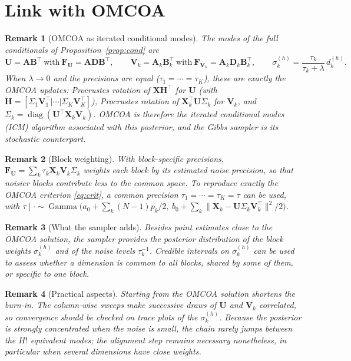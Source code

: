 \documentclass[11pt]{article}
\newtheorem{remark}{Remark}
\DeclareMathOperator{\diag}{diag}
\DeclareMathOperator{\Ga}{Gamma}
\newcommand{\X}{\mathbf{X}}
\newcommand{\U}{\mathbf{U}}
\newcommand{\V}{\mathbf{V}}
\newcommand{\F}{\mathbf{F}}
\begin{document}
\section{Link with OMCOA}

\begin{remark}[OMCOA as iterated conditional modes]
The modes of the full conditionals of Proposition~\ref{prop:cond} are
\[
  \U=\mathbf A\mathbf B^\intercal\ \text{with}\ \F_{\U}=\mathbf A\mathbf D\mathbf B^\intercal,\qquad
  \V_k=\mathbf A_k\mathbf B_k^\intercal\ \text{with}\ \F_{\V_k}=\mathbf A_k\mathbf D_k\mathbf B_k^\intercal,\qquad
  \sigma_k^{(h)}=\frac{\tau_k}{\tau_k+\lambda}\,d_k^{(h)} .
\]
When $\lambda\to0$ and the precisions are equal ($\tau_1=\cdots=\tau_K$), these are exactly the OMCOA updates:
Procrustes rotation of $\X\mathbf H^\intercal$ for $\U$ (with $\mathbf H=[\Sigma_1\V_1^\intercal|\cdots|\Sigma_K\V_K^\intercal]$),
Procrustes rotation of $\X_k^\intercal\U\Sigma_k$ for $\V_k$, and $\Sigma_k=\diag(\U^\intercal\X_k\V_k)$. OMCOA is therefore the
iterated conditional modes (ICM) algorithm \cite{besag1986} associated with this posterior, and the Gibbs sampler is its
stochastic counterpart.
\end{remark}

\begin{remark}[Block weighting]
With block-specific precisions, $\F_{\U}=\sum_k\tau_k\X_k\V_k\Sigma_k$ weights each block by its estimated noise
precision, so that noisier blocks contribute less to the common space. To reproduce exactly the OMCOA criterion
\eqref{eq:crit}, a common precision $\tau_1=\cdots=\tau_K=\tau$ can be used, with
$\tau\mid\cdot\sim\Ga\bigl(a_0+\sum_k(N-1)p_k/2,\ b_0+\sum_k\|\X_k-\U\Sigma_k\V_k^\intercal\|^2/2\bigr)$.
\end{remark}

\begin{remark}[What the sampler adds]
Besides point estimates close to the OMCOA solution, the sampler provides the posterior distribution of the block
weights $\sigma_k^{(h)}$ and of the noise levels $\tau_k^{-1}$. Credible intervals on $\sigma_k^{(h)}$ can be used to assess
whether a dimension is common to all blocks, shared by some of them, or specific to one block.
\end{remark}

\begin{remark}[Practical aspects]
Starting from the OMCOA solution shortens the burn-in. The column-wise sweeps make successive draws of $\U$ and
$\V_k$ correlated, so convergence should be checked on trace plots of the $\sigma_k^{(h)}$. Because the posterior is
strongly concentrated when the noise is small, the chain rarely jumps between the $H!$ equivalent modes; the alignment step
remains necessary nonetheless, in particular when several dimensions have close weights.
\end{remark}
\end{document}
